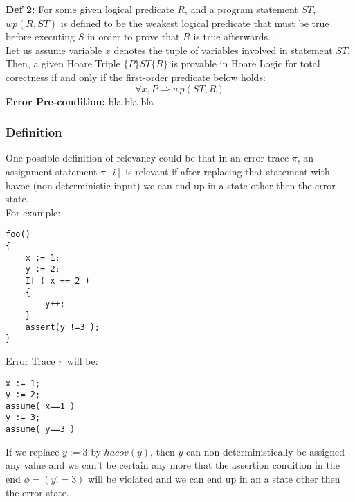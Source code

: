 \documentclass{article}
\begin{document}
\textbf{Def 2: }For some given logical predicate $R$, and a program statement $ST$, $wp(R,ST)$ is defined to be the weakest logical predicate that must be true before executing $S$ in order to prove that $R$ is true afterwards. \cite{wpdefinition}.\\
Let us assume variable $x$ denotes the tuple of variables involved in statement $ST$. Then, a given Hoare Triple $\{P\} ST \{R\}$ is provable in Hoare Logic for total corectness if and only if the first-order predicate below holds:
$$\forall x,P \Rightarrow wp(ST,R)$$
\textbf{Error Pre-condition: }bla bla bla


\subsubsection{Definition}
One possible definition of relevancy could be that in an error trace $\pi$, an assignment statement $\pi[i]$ is relevant if after replacing that statement with havoc (non-deterministic input) we can end up in a state other then the error state.\\
For example:
\begin{lstlisting}
foo()
{
	x := 1;
	y := 2;
	If ( x == 2 )
	{
		y++;
	}
	assert(y !=3 );
}
\end{lstlisting}
Error Trace $\pi$ will be:
\begin{lstlisting}
x := 1;
y := 2;
assume( x==1 )
y := 3;
assume( y==3 )
\end{lstlisting}
If we replace $y:=3$ by $hacov(y)$, then $y$ can non-deterministically be assigned any value and we can't be certain any more that the assertion condition in the end $\phi = (y!=3)$ will be violated and we can end up in an a state other then the error state.
\end{document}
